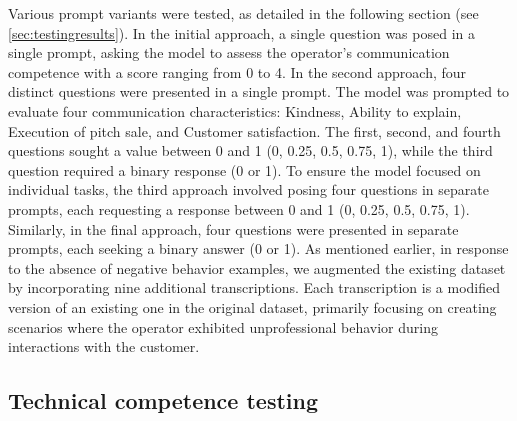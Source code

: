 Various prompt variants were tested, as detailed in the following section (see \ref{sec:testingresults}). In the initial approach, a single question was posed in a single prompt, asking the model to assess the operator's communication competence with a score ranging from 0 to 4. In the second approach, four distinct questions were presented in a single prompt. The model was prompted to evaluate four communication characteristics: Kindness, Ability to explain, Execution of pitch sale, and Customer satisfaction. The first, second, and fourth questions sought a value between 0 and 1 (0, 0.25, 0.5, 0.75, 1), while the third question required a binary response (0 or 1). To ensure the model focused on individual tasks, the third approach involved posing four questions in separate prompts, each requesting a response between 0 and 1 (0, 0.25, 0.5, 0.75, 1). Similarly, in the final approach, four questions were presented in separate prompts, each seeking a binary answer (0 or 1). As mentioned earlier, in response to the absence of negative behavior examples, we augmented the existing dataset by incorporating nine additional transcriptions. Each transcription is a modified version of an existing one in the original dataset, primarily focusing on creating scenarios where the operator exhibited unprofessional behavior during interactions with the customer.

\subsection{Technical competence testing}
\label{sec:techcomp}


